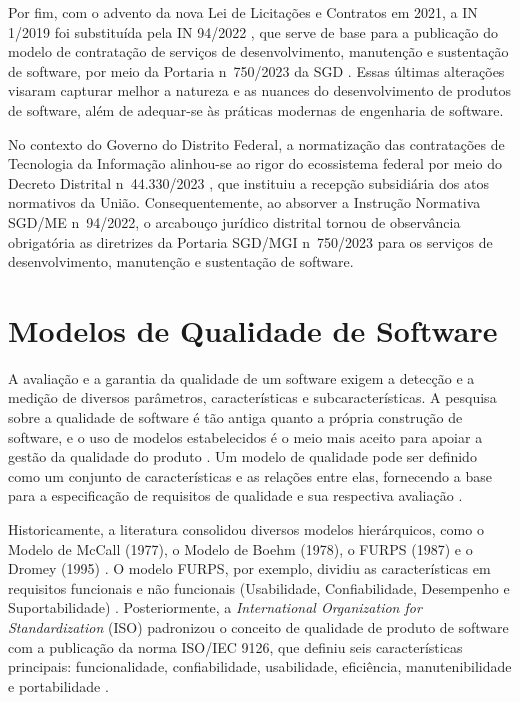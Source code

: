 Por fim, com o advento da nova Lei de Licitações e Contratos em 2021, a IN 1/2019 foi substituída pela IN 94/2022 \cite{brasil2022in94}, que serve de base para a publicação do modelo de contratação de serviços de desenvolvimento, manutenção e sustentação de software, por meio da Portaria n\textordmasculine\ 750/2023 da SGD \cite{brasil2023portaria750}. Essas últimas alterações visaram capturar melhor a natureza e as nuances do desenvolvimento de produtos de software, além de adequar-se às práticas modernas de engenharia de software.

No contexto do Governo do Distrito Federal, a normatização das contratações de Tecnologia da Informação alinhou-se ao rigor do ecossistema federal por meio do Decreto Distrital n\textordmasculine\ 44.330/2023 \cite{distritofederal2023decreto44330}, que instituiu a recepção subsidiária dos atos normativos da União. Consequentemente, ao absorver a Instrução Normativa SGD/ME n\textordmasculine\ 94/2022, o arcabouço jurídico distrital tornou de observância obrigatória as diretrizes da Portaria SGD/MGI n\textordmasculine\ 750/2023 para os serviços de desenvolvimento, manutenção e sustentação de software.

\section{Modelos de Qualidade de Software}

A avaliação e a garantia da qualidade de um software exigem a detecção e a medição de diversos parâmetros, características e subcaracterísticas. A pesquisa sobre a qualidade de software é tão antiga quanto a própria construção de software, e o uso de modelos estabelecidos é o meio mais aceito para apoiar a gestão da qualidade do produto \cite{miguel2014review}. Um modelo de qualidade pode ser definido como um conjunto de características e as relações entre elas, fornecendo a base para a especificação de requisitos de qualidade e sua respectiva avaliação \cite{miguel2014review}.

Historicamente, a literatura consolidou diversos modelos hierárquicos, como o Modelo de McCall (1977), o Modelo de Boehm (1978), o FURPS (1987) e o Dromey (1995) \cite{curcio2016}. O modelo FURPS, por exemplo, dividiu as características em requisitos funcionais e não funcionais (Usabilidade, Confiabilidade, Desempenho e Suportabilidade) \cite{miguel2014review}. Posteriormente, a \textit{International Organization for Standardization} (ISO) padronizou o conceito de qualidade de produto de software com a publicação da norma ISO/IEC 9126, que definiu seis características principais: funcionalidade, confiabilidade, usabilidade, eficiência, manutenibilidade e portabilidade \cite{curcio2016}.

